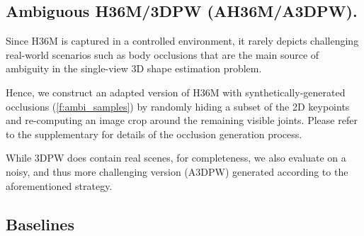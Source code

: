 \subsection{Ambiguous H36M/3DPW (AH36M/A3DPW).}
Since H36M is captured in a controlled environment, it rarely depicts challenging real-world scenarios such as body occlusions that are the main source of ambiguity in the single-view 3D shape estimation problem.

Hence, we construct an adapted version of H36M with synthetically-generated occlusions (\cref{f:ambi_samples}) by randomly hiding a subset of the 2D keypoints and re-computing an image crop around the remaining visible joints. Please refer to the supplementary for details of the occlusion generation process.

While 3DPW does contain real scenes, for completeness, we also evaluate on a noisy, and thus more challenging version (A3DPW) generated according to the aforementioned strategy.





\subsection{Baselines}\label{s:exp_baselines}

